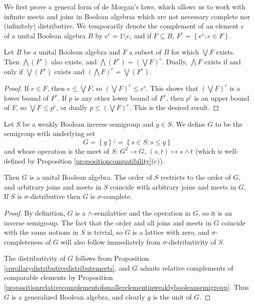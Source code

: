 We first prove a general form of de Morgan's laws, which allows us to work with infinite meets and joins in Boolean algebras which are not necessary complete nor (infinitely) distributive. We temporarily denote the complement of an element $e$ of a unital Boolean algebra $B$ by $e^c=1\setminus e$, and if $F\subseteq B$, $F^c=\left\{e^c:e\in F\right\}$.

\begin{lemma}\label{lemmainfinitedemorganslaws}
Let $B$ be a unital Boolean algebra and $F$ a subset of $B$ for which $\bigvee F$ exists. Then $\bigwedge (F^c)$ also exists, and $\bigwedge(F^c)=\left(\bigvee F\right)^c$. Dually, $\bigwedge F$ exists if and only if $\bigvee(F^c)$ exists and $\left(\bigwedge F\right)^c=\bigvee(F^c)$.
\end{lemma}
\begin{proof}
If $e\in F$, then $e\leq\bigvee F$, so $\left(\bigvee F\right)^c\leq e^c$. This shows that $\left(\bigvee F\right)^c$ is a lower bound of $F^c$. If $p$ is any other lower bound of $F^c$, then $p^c$ is an upper bound of $F$, so $\bigvee F\leq p^c$, or dually $p\leq\left(\bigvee F\right)^c$. This is the desired result.\qedhere
\end{proof}

\begin{lemma}\label{lemmabooleanalgebraofsmallerelements}
Let $S$ be a weakly Boolean inverse semigroup and $g\in S$. We define $G$ to be the semigroup with underlying set
\[G=\left\{g\right\}^{\downarrow}=\left\{s\in S:s\leq g\right\}\]
and whose operation is the meet of $S$: $G^2\to G$, $(s,t)\mapsto s\land t$ (which is well-defined by Proposition \ref{propositioncompatibility}(c)).

Then $G$ is a unital Boolean algebra. The order of $S$ restricts to the order of $G$, and arbitrary joins and meets in $S$ coincide with arbitrary joins and meets in $G$. If $S$ is $\sigma$-distributive then $G$ is $\sigma$-complete.
\end{lemma}
\begin{proof}
By definition, $G$ is a $\land$-semilattice and the operation in $G$, so it is an inverse semigroup. The fact that the order and all joins and meets in $G$ coincide with the same notions in $S$ is trivial, so $G$ is a lattice with zero, and $\sigma$-completeness of $G$ will also follow immediately from $\sigma$-distributivity of $S$.

The distributivity of $G$ follows from Proposition \ref{corollarydistributivedistributemeets}, and $G$ admits relative complements of comparable elements by Proposition \ref{propositionrelativecomplementofsmallerelementinweaklybooleansemigroup}. Thus $G$ is a generalized Boolean algebra, and clearly $g$ is the unit of $G$.\qedhere
\end{proof}


